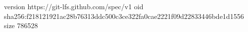 version https://git-lfs.github.com/spec/v1
oid sha256:f218121921ac28b76313ddc500c3ce322fa0cae2221f09d22833446bde1d1556
size 786528
